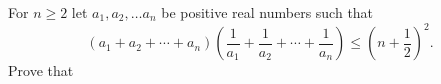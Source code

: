 For $ n\geq2$ let $ a_1, a_2, \ldots a_n$ be positive real numbers such that
\[ (a_1 + a_2 + \cdots + a_n)\left(\frac {1}{a_1} + \frac {1}{a_2} + \cdots + \frac {1}{a_n}\right) \leq \left(n + \frac {1}{2}\right)^2.
\]
Prove that 